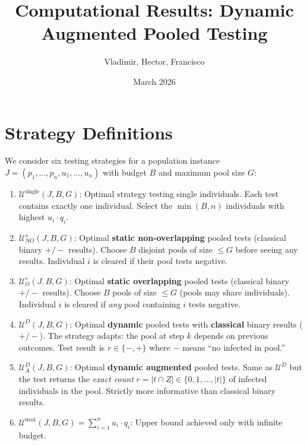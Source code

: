 \documentclass[11pt]{article}
\title{Computational Results: Dynamic Augmented Pooled Testing}
\author{Vladimir, Hector, Francisco}
\date{March 2026}
\newcommand{\Usingle}{\mathcal{U}^{\text{single}}}
\newcommand{\UsNO}{\mathcal{U}^{s}_{NO}}
\newcommand{\UsO}{\mathcal{U}^{s}_{O}}
\newcommand{\UD}{\mathcal{U}^{D}}
\newcommand{\UDA}{\mathcal{U}^{D}_{A}}
\newcommand{\Umax}{\mathcal{U}^{\max}}
\begin{document}
\maketitle

\section{Strategy Definitions}

We consider six testing strategies for a population instance $J = (p_1, \ldots, p_n, u_1, \ldots, u_n)$
with budget $B$ and maximum pool size $G$:

\begin{enumerate}
    \item $\Usingle(J, B, G)$: Optimal strategy testing single individuals.
    Each test contains exactly one individual. Select the $\min(B, n)$
    individuals with highest $u_i \cdot q_i$.

    \item $\UsNO(J, B, G)$: Optimal \textbf{static non-overlapping} pooled tests
    (classical binary $+/-$ results). Choose $B$ disjoint pools of size $\leq G$
    before seeing any results. Individual $i$ is cleared if their pool tests negative.

    \item $\UsO(J, B, G)$: Optimal \textbf{static overlapping} pooled tests
    (classical binary $+/-$ results). Choose $B$ pools of size $\leq G$
    (pools may share individuals). Individual $i$ is cleared if \emph{any}
    pool containing $i$ tests negative.

    \item $\UD(J, B, G)$: Optimal \textbf{dynamic} pooled tests with
    \textbf{classical} binary results ($+/-$). The strategy adapts: the pool
    at step $k$ depends on previous outcomes. Test result is
    $r \in \{-, +\}$ where $-$ means ``no infected in pool.''

    \item $\UDA(J, B, G)$: Optimal \textbf{dynamic augmented} pooled tests.
    Same as $\UD$ but the test returns the \emph{exact count}
    $r = |t \cap Z| \in \{0, 1, \ldots, |t|\}$ of infected individuals in the pool.
    Strictly more informative than classical binary results.

    \item $\Umax(J, B, G) = \sum_{i=1}^{n} u_i \cdot q_i$: Upper bound
    achieved only with infinite budget.
\end{enumerate}
\end{document}
